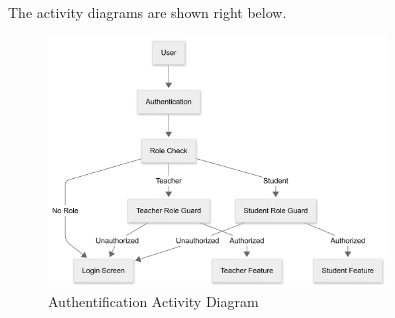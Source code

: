 \documentclass[12pt,a4paper]{report}
\begin{document}
The activity diagrams are shown right below.
\begin{figure}[htbp]
    \centering
    \includegraphics[width=0.8\textwidth]{images/morsli/Activity1.png}
    \caption{Authentification Activity Diagram}
    \label{fig:attendance-system}
\end{figure}

\vspace{20cm}
\end{document}
